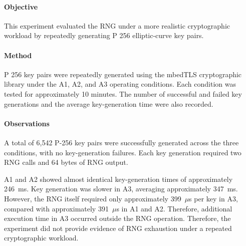 \documentclass[a4paper, 12pt]{article}
\begin{document}
\paragraph{Objective}
This experiment evaluated the RNG under a more realistic cryptographic
workload by repeatedly generating P 256 elliptic-curve key pairs.

\paragraph{Method}
P 256 key pairs were repeatedly generated using the mbedTLS cryptographic
library under the A1, A2, and A3 operating conditions. Each condition was tested for approximately 10 minutes. The number of
successful and failed key generations and the average key-generation time were
also recorded.

\begin{table}[htbp]
    \centering
    \caption{P-256 key-generation stress-test results}
    \label{tab:p256_results}
\end{table}

\paragraph{Observations}
A total of 6,542 P-256 key pairs were successfully generated across the three
conditions, with no key-generation failures. Each key generation required two
RNG calls and 64 bytes of RNG output.

A1 and A2 showed almost identical key-generation times of approximately
246~ms. Key generation was slower in A3, averaging approximately 347~ms.
However, the RNG itself required only approximately 399~$\mu$s per key in A3,
compared with approximately 391~$\mu$s in A1 and A2. Therefore, additional execution time in A3 occurred outside the RNG operation. Therefore, the experiment did not provide evidence of RNG exhaustion under a
repeated cryptographic workload.
\end{document}
